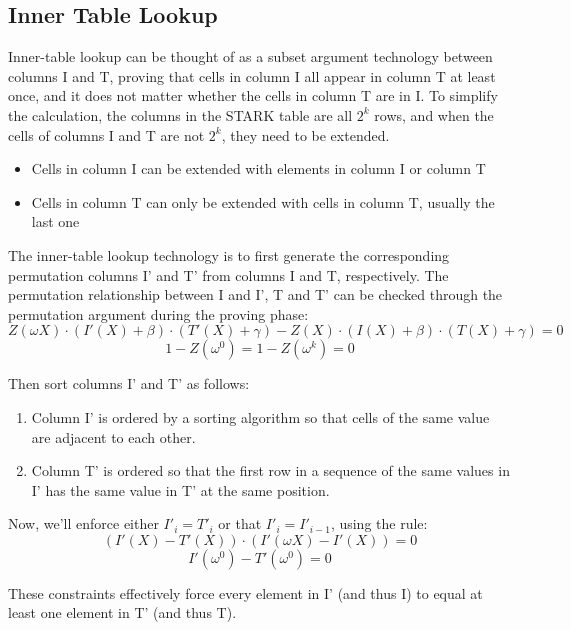 \subsection{Inner Table Lookup}\label{section: inner-table-lookup}

Inner-table lookup can be thought of as a subset argument technology between columns I and T, proving that cells in column I all appear in column T at least once, and it does not matter whether the cells in column T are in I. To simplify the calculation, the columns in the STARK table are all $2^k$ rows, and when the cells of columns I and T are not $2^k$, they need to be extended.

\begin{itemize}
    \item Cells in column I can be extended with elements in column I or column T
    \item Cells in column T can only be extended with cells in column T, usually the last one
\end{itemize}

The inner-table lookup technology is to first generate the corresponding permutation columns I' and T' from columns I and T, respectively. The permutation relationship between I and I', T and T' can be checked through the permutation argument during the proving phase:
$$Z(\omega X) \cdot (I'(X) + \beta) \cdot (T'(X) + \gamma) - Z(X) \cdot (I(X) + \beta) \cdot (T(X) + \gamma) = 0$$
$$1 - Z(\omega^0) = 1 - Z(\omega^{k}) = 0$$

\noindent Then sort columns I' and T' as follows:

\begin{enumerate}
    \item Column I' is ordered by a sorting algorithm so that cells of the same value are adjacent to each other.
    \item Column T' is ordered so that the first row in a sequence of the same values in I' has the same value in T' at the same position.
\end{enumerate}

\noindent Now, we'll enforce either $I'_{i} = T'_{i}$ or that $I'_{i}=I'_{i-1}$, using the rule:
$$(I'(X) - T'(X)) \cdot (I'(\omega X) - I'(X)) = 0$$
$$I'(\omega^0) - T'(\omega^0) = 0$$

These constraints effectively force every element in I' (and thus I) to equal at least one element in T' (and thus T).